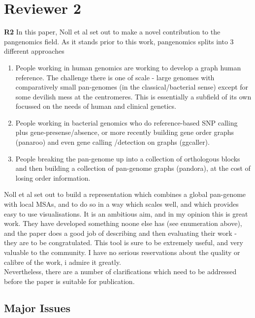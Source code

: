 \documentclass{article}
\newcommand{\review}[1]{\textbf{#1}}
\begin{document}
\section*{Reviewer 2}

\review{R2} In this paper, Noll et al set out to make a novel contribution to the pangenomics field. As it stands prior to this work, pangenomics splits into 3 different approaches

\begin{enumerate}
    \item People working in human genomics are working to develop a graph human reference. The challenge there is one of scale - large genomes with comparatively small pan-genomes (in the classical/bacterial sense) except for some devilish mess at the centromeres. This is essentially a subfield of its own focussed on the needs of human and clinical genetics.

    \item People working in bacterial genomics who do reference-based SNP calling plus gene-presense/absence, or more recently building gene order graphs (panaroo) and even gene calling /detection on graphs (ggcaller).

    \item People breaking the pan-genome up into a collection of orthologous blocks and then building a collection of pan-genome graphs (pandora), at the cost of losing order information.
\end{enumerate}


Noll et al set out to build a representation which combines a global pan-genome with local MSAs, and to do so in a way which scales well, and which provides easy to use visualisations. It is an ambitious aim, and in my opinion this is great work. They have developed something noone else has (see enumeration above), and the paper does a good job of describing and then evaluating their work - they are to be congratulated. This tool is sure to be extremely useful, and very valuable to the community. I have no serious reservations about the quality or calibre of the work, i admire it greatly.\\

Nevertheless, there are a number of clarifications which need to be addressed before the paper is suitable for publication.\\

\subsection*{Major Issues}
\end{document}
